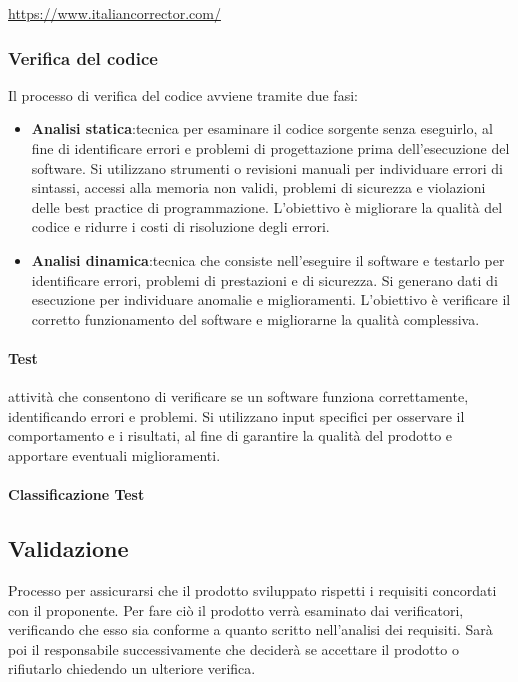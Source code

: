 \documentclass[12pt]{article}
\begin{document}
     \url{https://www.italiancorrector.com/}
\subsubsection{Verifica del codice}
Il processo di verifica del codice avviene tramite due fasi:
\begin{itemize}
	\item \textbf{Analisi statica}:tecnica per esaminare il codice sorgente senza eseguirlo, al fine di identificare errori e problemi di progettazione prima dell'esecuzione del software. Si utilizzano strumenti o revisioni manuali per individuare errori di sintassi, accessi alla memoria non validi, problemi di sicurezza e violazioni delle best practice di programmazione. L'obiettivo è migliorare la qualità del codice e ridurre i costi di risoluzione degli errori.
	\item \textbf{Analisi dinamica}:tecnica che consiste nell'eseguire il software e testarlo per identificare errori, problemi di prestazioni e di sicurezza. Si generano dati di esecuzione per individuare anomalie e miglioramenti. L'obiettivo è verificare il corretto funzionamento del software e migliorarne la qualità complessiva.
\end{itemize}	
\paragraph{Test} attività che consentono di verificare se un software funziona correttamente, identificando errori e problemi. Si utilizzano input specifici per osservare il comportamento e i risultati, al fine di garantire la qualità del prodotto e apportare eventuali miglioramenti.
\paragraph{Classificazione Test}

\label{Validazione}
\subsection{Validazione}
Processo per assicurarsi che il prodotto sviluppato rispetti i requisiti concordati con il proponente.
Per fare ciò il prodotto verrà esaminato dai verificatori, verificando che esso sia conforme a quanto scritto nell'analisi dei requisiti. Sarà poi il responsabile successivamente che deciderà se accettare il prodotto o rifiutarlo chiedendo un ulteriore verifica.
\end{document}
